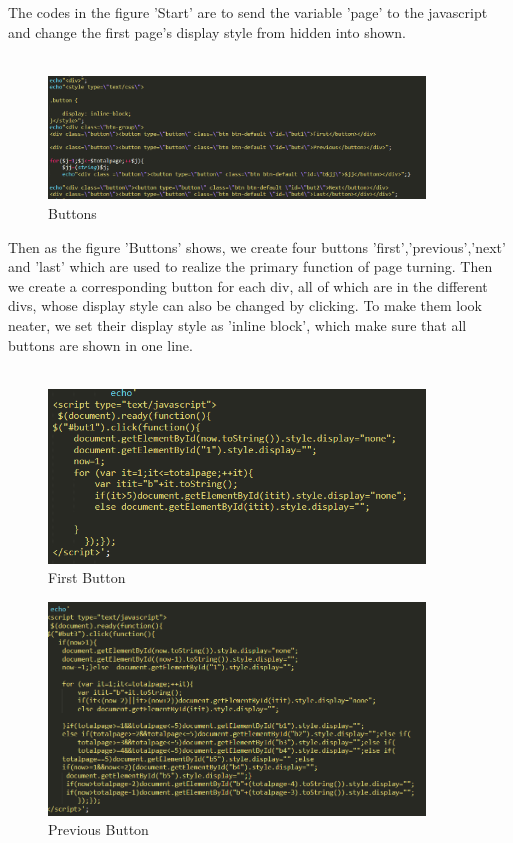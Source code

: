 \documentclass{book}
\begin{document}
The codes in the figure 'Start' are to send the variable 'page' to the javascript and change the first page's display style from hidden into shown.\\\\

\begin{figure}[H]
\centering
\includegraphics[width=10.0cm]{img/dsw_button.png}
\caption{Buttons}
\end{figure}


Then as the figure 'Buttons' shows, we create four buttons 'first','previous','next' and 'last' which are used to realize the primary function of page turning. Then we create a corresponding button for each div, all of which are in the different divs, whose display style can also be changed by clicking. To make them look neater, we set their display style as 'inline block', which make sure that all buttons are shown in one line.\\\\

\begin{figure}[H]
\centering
\includegraphics[width=10.0cm]{img/dsw_first1.png}
\caption{First Button}
\end{figure}

\begin{figure}[H]
\centering
\includegraphics[width=10.0cm]{img/dsw_pr1.png}
\caption{Previous Button}
\end{figure}
\end{document}

